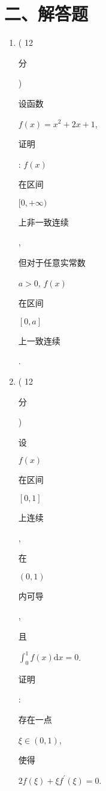 \documentclass[10pt]{article}
\begin{document}
\section{二、解答题}
\begin{enumerate}
  \item ( 12 \begin{CJK}{UTF8}{mj}分\end{CJK}) \begin{CJK}{UTF8}{mj}设函数\end{CJK} $f(x)=x^{2}+2 x+1$, \begin{CJK}{UTF8}{mj}证明\end{CJK}: $f(x)$ \begin{CJK}{UTF8}{mj}在区间\end{CJK} $[0,+\infty)$ \begin{CJK}{UTF8}{mj}上非一致连续\end{CJK}, \begin{CJK}{UTF8}{mj}但对于任意实常数\end{CJK} $a>0$, $f(x)$ \begin{CJK}{UTF8}{mj}在区间\end{CJK} $[0, a]$ \begin{CJK}{UTF8}{mj}上一致连续\end{CJK}.

  \item ( 12 \begin{CJK}{UTF8}{mj}分\end{CJK}) \begin{CJK}{UTF8}{mj}设\end{CJK} $f(x)$ \begin{CJK}{UTF8}{mj}在区间\end{CJK} $[0,1]$ \begin{CJK}{UTF8}{mj}上连续\end{CJK}, \begin{CJK}{UTF8}{mj}在\end{CJK} $(0,1)$ \begin{CJK}{UTF8}{mj}内可导\end{CJK}, \begin{CJK}{UTF8}{mj}且\end{CJK} $\int_{0}^{1} f(x) \mathrm{d} x=0$. \begin{CJK}{UTF8}{mj}证明\end{CJK}: \begin{CJK}{UTF8}{mj}存在一点\end{CJK} $\xi \in(0,1)$, \begin{CJK}{UTF8}{mj}使得\end{CJK} $2 f(\xi)+\xi f^{\prime}(\xi)=0$.


\end{enumerate}
\end{document}
